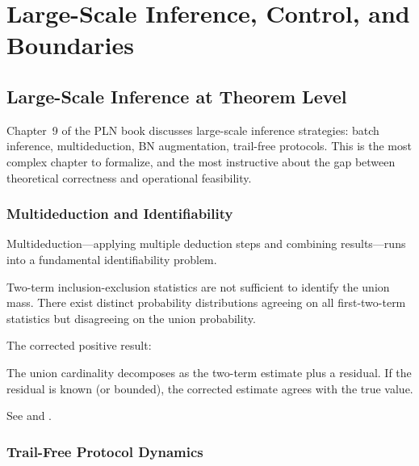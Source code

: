 \documentclass[11pt,openany]{report}
\begin{document}
\part{Large-Scale Inference, Control, and Boundaries}
\label{part:large-scale}

\chapter{Large-Scale Inference at Theorem Level}
\label{ch:large-scale}

Chapter~9 of the PLN book discusses large-scale inference strategies:
batch inference, multideduction, BN augmentation, trail-free protocols.
This is the most complex chapter to formalize, and the most instructive
about the gap between theoretical correctness and operational feasibility.

\section{Multideduction and Identifiability}

Multideduction---applying multiple deduction steps and combining
results---runs into a fundamental identifiability problem.

\begin{theorem}
Two-term inclusion-exclusion statistics are not sufficient to identify the
union mass.  There exist distinct probability distributions agreeing on all
first-two-term statistics but disagreeing on the union probability.
\end{theorem}

The corrected positive result:

\begin{theorem}
The union cardinality decomposes as the two-term estimate plus a residual.
If the residual is known (or bounded), the corrected estimate agrees with
the true value.
\end{theorem}

See  and
.

\section{Trail-Free Protocol Dynamics}
\end{document}
